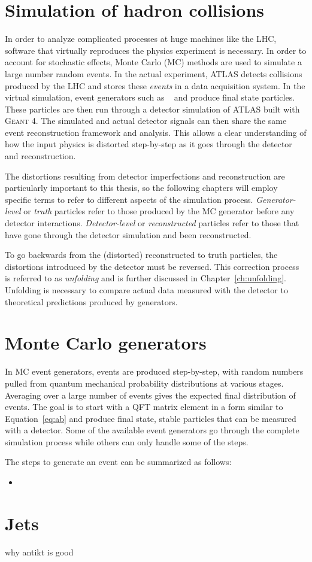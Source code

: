 \section{Simulation of hadron collisions}

In order to analyze complicated processes at huge machines like the LHC, software that virtually reproduces the physics experiment is necessary. In order to account for stochastic effects, Monte Carlo (MC) methods are used to simulate a large number random events.  In the actual experiment, ATLAS detects collisions produced by the LHC and stores these \emph{events} in a data acquisition system. In the virtual simulation, event generators such as \hw~\cite{Herwig} and \py\cite{Pythia} produce final state particles. These particles are then run through a detector simulation of ATLAS built with \textsc{Geant 4}. The simulated and actual detector signals can then share the same event reconstruction framework and analysis. This allows a clear understanding of how the input physics is distorted step-by-step as it goes through the detector and reconstruction. 

The distortions resulting from detector imperfections and reconstruction are particularly important to this thesis, so the following chapters will employ specific terms to refer to different aspects of the simulation process. \emph{Generator-level} or \emph{truth} particles refer to those produced by the MC generator before any detector interactions. \emph{Detector-level} or \emph{reconstructed} particles refer to those that have gone through the detector simulation and been reconstructed. 

To go backwards from the (distorted) reconstructed to truth particles, the distortions introduced by the detector must be reversed. This correction process is referred to as \emph{unfolding} and is further discussed in Chapter~\ref{ch:unfolding}. Unfolding is necessary to compare actual data measured with the detector to theoretical predictions produced by generators.
\section{Monte Carlo generators}
In MC event generators, events are produced step-by-step, with random numbers pulled from quantum mechanical probability distributions at various stages. Averaging over a large number of events gives the expected final distribution of events. The goal is to start with a QFT matrix element in a form similar to Equation~\ref{eq:ab} and produce final state, stable particles that can be measured with a detector. Some of the available event generators go through the complete simulation process while others can only handle some of the steps.

The steps to generate an event can be summarized as follows:
\begin{itemize}
\item
\end{itemize}


\section{Jets}
why antikt is good